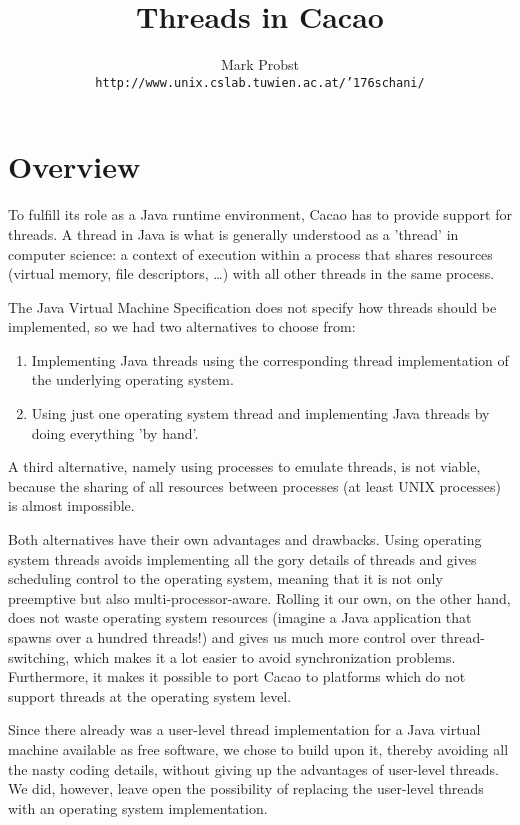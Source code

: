 \documentclass[twocolumn,a4paper]{article}      %
\author{
	Mark Probst\\
	{\tt http://www.unix.cslab.tuwien.ac.at/\char'176schani/}
	}
\title{Threads in Cacao}
\begin{document}
\maketitle

\section{Overview}
\label{sec:overview}

To fulfill its role as a Java runtime environment, Cacao has to
provide support for threads. A thread in Java is what is generally
understood as a 'thread' in computer science: a context of execution
within a process that shares resources (virtual memory, file
descriptors, \dots ) with all other threads in the same process.

The Java Virtual Machine Specification does not specify how threads
should be implemented, so we had two alternatives to choose from:

\begin{enumerate}
\item Implementing Java threads using the corresponding thread implementation of the
underlying operating system.
\item Using just one operating system thread and implementing Java threads by doing
everything 'by hand'.
\end{enumerate}

A third alternative, namely using processes to emulate threads, is not
viable, because the sharing of all resources between processes (at
least UNIX processes) is almost impossible.

Both alternatives have their own advantages and drawbacks. Using
operating system threads avoids implementing all the gory details of
threads and gives scheduling control to the operating system, meaning
that it is not only preemptive but also multi-processor-aware.
Rolling it our own, on the other hand, does not waste operating system
resources (imagine a Java application that spawns over a hundred
threads!) and gives us much more control over thread-switching, which
makes it a lot easier to avoid synchronization problems. Furthermore,
it makes it possible to port Cacao to platforms which do not support
threads at the operating system level.

Since there already was a user-level thread implementation for a Java
virtual machine available as free software, we chose to build upon it,
thereby avoiding all the nasty coding details, without giving up the
advantages of user-level threads. We did, however, leave open the
possibility of replacing the user-level threads with an operating
system implementation.
\end{document}
